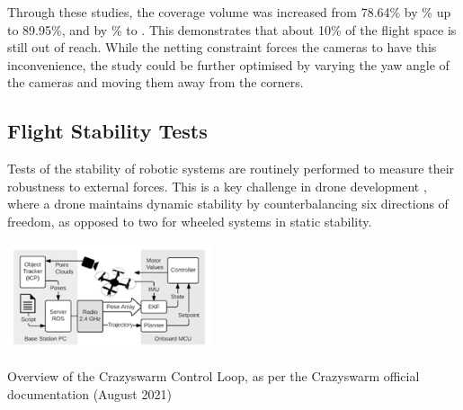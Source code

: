 Through these studies, the coverage volume was increased from 78.64\% by \% up to 89.95\%, and by \% to . This demonstrates that about 10\% of the flight space is still out of reach. While the netting constraint forces the cameras to have this inconvenience, the study could be further optimised by varying the yaw angle of the cameras and moving them away from the corners.



\pagebreak
\subsection{Flight Stability Tests}

Tests of the stability of robotic systems are routinely performed to measure their robustness to external forces. This is a key challenge in drone development \cite{crazyflie_docs}, where a drone maintains dynamic stability by counterbalancing six directions of freedom, as opposed to two for wheeled systems in static stability. 

\begin{marginfigure}%
  \includegraphics[width=6cm, center]{images/testbed/controlloop_bw.png}
  \caption{Overview of the Crazyswarm Control Loop, as per the Crazyswarm official documentation (August 2021) \cite{crazyswarm_docs}}
\end{marginfigure}

